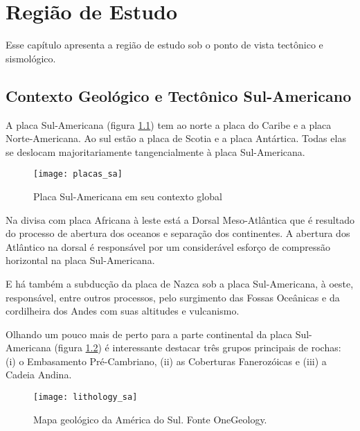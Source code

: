 \chapter{Região de Estudo}
\label{cap:regiao_de_estudo}


Esse capítulo apresenta a região de estudo sob o ponto de vista tectônico e sismológico.

\section{Contexto Geológico e Tectônico Sul-Americano}
\label{sec:03_america_do_sul}

A placa Sul-Americana (figura \ref{fig:sa_plate}) tem ao norte a placa do Caribe e a placa Norte-Americana.
Ao sul estão a placa de Scotia e a placa Antártica. Todas elas se deslocam 
majoritariamente tangencialmente
à placa Sul-Americana.

\begin{figure}[H]
  \centering
  \texttt{[image: placas\_sa]} 
  \caption{Placa Sul-Americana em seu contexto global\footnotemark}
  \label{fig:sa_plate} 
\end{figure}

Na divisa com placa Africana à leste está a Dorsal Meso-Atlântica que é resultado
do processo de abertura dos oceanos e separação dos continentes. A abertura dos Atlântico na 
dorsal é responsável por um considerável esforço de compressão horizontal na placa Sul-Americana.

E há também a subducção da placa de Nazca sob a placa Sul-Americana, à oeste,
responsável, entre outros processos, pelo surgimento das Fossas Oceânicas e da
cordilheira dos Andes com suas altitudes e vulcanismo.

Olhando um pouco mais de perto para a parte continental da placa Sul-Americana
(figura \ref{fig:sa_tec}) é interessante destacar três grupos principais de rochas: 
(i) o Embasamento Pré-Cambriano, (ii) as Coberturas Fanerozóicas e (iii) a 
Cadeia Andina.

\begin{figure}[H]
  \centering
  \texttt{[image: lithology\_sa]} 
  \caption{Mapa geológico da América do Sul. Fonte OneGeology\footnotemark.}
  \label{fig:sa_tec} 
\end{figure}

